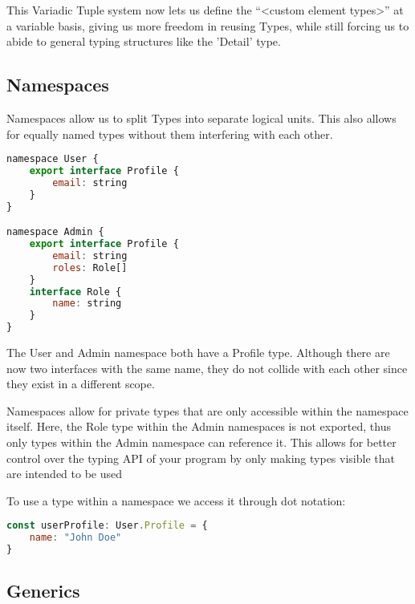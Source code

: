 \documentclass[english,runningheads, letterpaper]{llncs}[2018/03/10]
\begin{document}
\begin{remark}
This Variadic Tuple system now lets us define the ``<custom element
types>'' at a variable basis, giving us more freedom in reusing Types,
while still forcing us to abide to general typing structures like
the 'Detail' type.
\end{remark}


\subsection{Namespaces}

Namespaces allow us to split Types into separate logical units. This
also allows for equally named types without them interfering with
each other.

\begin{lstlisting}[style=ES6, language=JavaScript, caption="Namespace definition"]
namespace User {
	export interface Profile {
		email: string
	}
}

namespace Admin {
	export interface Profile {
		email: string
		roles: Role[]
	}
	interface Role {
		name: string
	}
}
\end{lstlisting}

\begin{note}
The User and Admin namespace both have a Profile type. Although there
are now two interfaces with the same name, they do not collide with
each other since they exist in a different scope.
\end{note}

\begin{note}
Namespaces allow for private types that are only accessible within
the namespace itself. Here, the Role type within the Admin namespaces
is not exported, thus only types within the Admin namespace can reference
it. This allows for better control over the typing API of your program
by only making types visible that are intended to be used
\end{note}

To use a type within a namespace we access it through dot notation:

\begin{lstlisting}[style=ES6, language=JavaScript, caption="Namespace usage"]
const userProfile: User.Profile = {
	name: "John Doe"
}
\end{lstlisting}

\subsection{Generics}
\end{document}

